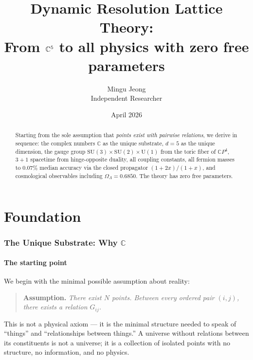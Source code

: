 \documentclass[12pt]{article}
\title{Dynamic Resolution Lattice Theory:\\[6pt]
\large From $\CC^5$ to all physics with zero free parameters}
\author{Mingu Jeong\\Independent Researcher}
\date{April 2026}
\theoremstyle{remark}
\theoremstyle{definition}
\newcommand{\CP}{\mathbb{C}P}
\newcommand{\CC}{\mathbb{C}}
\begin{document}
\maketitle

\begin{abstract}
Starting from the sole assumption that \emph{points exist with pairwise
relations}, we derive in sequence: the complex numbers $\CC$ as the
unique substrate, $d = 5$ as the unique dimension, the gauge group
$\mathrm{SU}(3)\times\mathrm{SU}(2)\times\mathrm{U}(1)$ from the
toric fiber of $\CP^4$, $3+1$ spacetime from hinge-opposite duality,
all coupling constants, all fermion masses to $0.07\%$ median accuracy
via the closed propagator $(1+2x)/(1+x)$, and cosmological observables
including $\Omega_\Lambda = 0.6850$.  The theory has zero free parameters.
\end{abstract}

\tableofcontents
\newpage


\part{Foundation}


\section{The Unique Substrate: Why $\mathbb{C}$}
\label{ch:whyC}

\subsection{The starting point}

We begin with the minimal possible assumption about reality:

\begin{quote}
\textbf{Assumption.} \emph{There exist $N$ points. Between every ordered pair $(i, j)$, there exists a relation $G_{ij}$.}
\end{quote}

This is not a physical axiom --- it is the minimal structure needed to speak of ``things'' and ``relationships between things.'' A universe without relations between its constituents is not a universe; it is a collection of isolated points with no structure, no information, and no physics.
\end{document}

